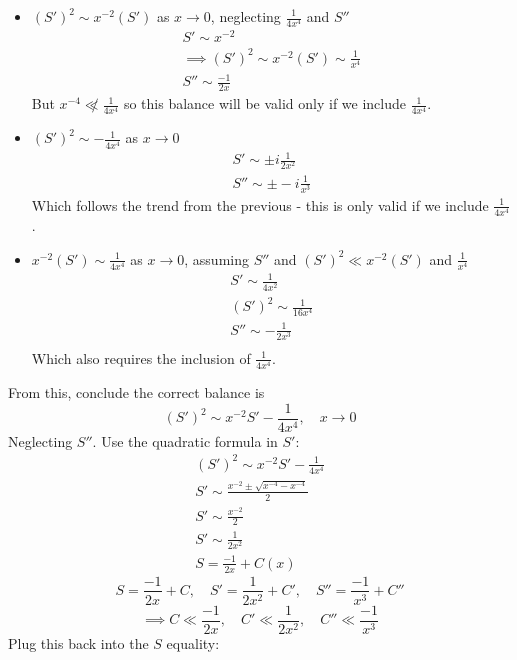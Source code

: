 \documentclass{/home/janmebows/Documents/LatexTemplates/myassignment}
\begin{document}
\begin{enumerate}
\begin{enumerate}
\begin{itemize}
            
            \item $(S')^2 \sim x^{-2}(S')$ as $x\to 0$, neglecting $\frac1{4x^4}$ and $S''$
            \begin{align*}
                S' \sim x^{-2}\\
                \implies (S')^2 \sim x^{-2}(S') \sim \frac{1}{x^4}\\
                S'' \sim \frac{-1}{2x}
            \end{align*}
            But $x^{-4} \not \ll \frac{1}{4x^{4}}$ so this balance will be valid only if we include $\frac1{4x^4}$.
            
            
            \item $(S')^2 \sim - \frac{1}{4x^4}$ as $x\to 0$
            \begin{align*}
                S' \sim \pm i\frac{1}{2x^2}\\
                S'' \sim \pm -i\frac{1}{x^3}
            \end{align*}
            Which follows the trend from the previous - this is only valid if we include $\frac{1}{4x^4}$.
            
            \item $x^{-2}(S') \sim \frac{1}{4x^4}$ as $x\to 0$, assuming $S''$ and $(S')^2 \ll x^{-2}(S')$ and $\frac{1}{x^4}$
            \begin{align*}
                S' \sim \frac1{4x^{2}}\\
                (S')^2 \sim \frac1{16x^{4}}\\
                S'' \sim -\frac{1}{2x^3}\\
            \end{align*}
            Which also requires the inclusion of $\frac{1}{4x^4}$.


        \end{itemize}

        \noindent\hrulefill

        From this, conclude the correct balance is
        \[(S')^2 \sim x^{-2} S' - \frac{1}{4x^4}, \quad x\to0\]
         Neglecting $S''$. Use the quadratic formula in $S'$:
        \begin{align*}
        (S')^2 \sim x^{-2} S' - \frac{1}{4x^4}\\
            S' \sim \frac{x^{-2} \pm \sqrt{x^{-4} - x^{-4}}}{2}\\
            S' \sim \frac{x^{-2}}{2}\\
            S' \sim \frac{1}{2x^2}\\
            S = \frac{-1}{2x} + C(x)
        \end{align*}
        \[S = \frac{-1}{2x} + C, \quad S' = \frac{1}{2x^2} + C', \quad S'' = \frac{-1}{x^3} + C''\]
        \[\implies C \ll \frac{-1}{2x},\quad C' \ll \frac{1}{2x^2}, \quad C'' \ll \frac{-1}{x^3}\]
                Plug this back into the $S$ equality:


\end{enumerate}
\end{enumerate}
\end{document}
